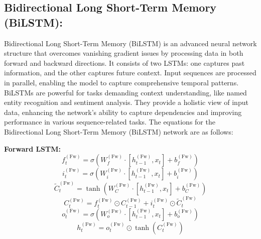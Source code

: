 \documentclass[sn-mathphys,Numbered]{sn-jnl}
\theoremstyle{thmstyleone}
\theoremstyle{thmstyletwo}
\theoremstyle{thmstylethree}
\begin{document}
\subsection{Bidirectional Long Short-Term Memory (BiLSTM):}
Bidirectional Long Short-Term Memory (BiLSTM) is an advanced neural network structure that overcomes vanishing gradient issues by processing data in both forward and backward directions. It consists of two LSTMs: one captures past information, and the other captures future context. Input sequences are processed in parallel, enabling the model to capture comprehensive temporal patterns. BiLSTMs are powerful for tasks demanding context understanding, like named entity recognition and sentiment analysis. They provide a holistic view of input data, enhancing the network's ability to capture dependencies and improving performance in various sequence-related tasks.
The equations for the Bidirectional Long Short-Term Memory (BiLSTM) network are as follows:

\textbf{Forward LSTM:}
\begin{equation}
f_t^{(\text{Fw})} = \sigma(W_{f}^{(\text{Fw})} \cdot [h_{t-1}^{(\text{Fw})}, x_t] + b_{f}^{(\text{Fw})})
\end{equation}
\begin{equation}
i_t^{(\text{Fw})} = \sigma(W_{i}^{(\text{Fw})} \cdot [h_{t-1}^{(\text{Fw})}, x_t] + b_{i}^{(\text{Fw})})
\end{equation}
\begin{equation}
\tilde{C}_t^{(\text{Fw})} = \tanh(W_{C}^{(\text{Fw})} \cdot [h_{t-1}^{(\text{Fw})}, x_t] + b_{C}^{(\text{Fw})})
\end{equation}
\begin{equation}
C_t^{(\text{Fw})} = f_t^{(\text{Fw})} \odot C_{t-1}^{(\text{Fw})} + i_t^{(\text{Fw})} \odot \tilde{C}_t^{(\text{Fw})}
\end{equation}
\begin{equation}
o_t^{(\text{Fw})} = \sigma(W_{o}^{(\text{Fw})} \cdot [h_{t-1}^{(\text{Fw})}, x_t] + b_{o}^{(\text{Fw})})
\end{equation}
\begin{equation}
h_t^{(\text{Fw})} = o_t^{(\text{Fw})} \odot \tanh(C_t^{(\text{Fw})})
\end{equation}
\end{document}
